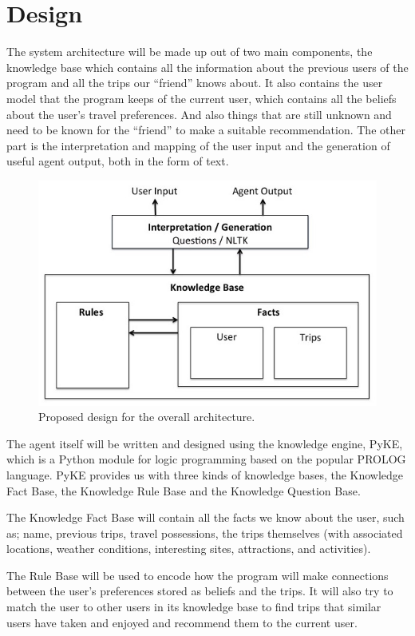 \documentclass[11pt]{article} %
\begin{document}
\section{Design}
The system architecture will be made up out of two main
components, the knowledge base which contains all the
information about the previous users of the program and
all the trips our ``friend'' knows about. It also contains
the user model that the program keeps of the current
user, which contains all the beliefs about the user’s
travel preferences. And also things that are still unknown
and need to be known for the ``friend'' to make a suitable
recommendation. The other part is the interpretation and
mapping of the user input and the generation of useful
agent output, both in the form of text.

\begin{figure}[H]
\centering
\includegraphics[width=12cm]{architecture.jpg}
\caption{Proposed design for the overall architecture.}
\end{figure}

The agent itself will be written and designed using the
knowledge engine, PyKE, which is a Python module for logic
programming based on the popular PROLOG language.
PyKE provides us with three kinds of knowledge bases,
the Knowledge Fact Base, the Knowledge Rule Base and
the Knowledge Question Base.

The Knowledge Fact Base will contain all the facts we
know about the user, such as; name, previous trips, travel
possessions, the trips themselves (with associated
locations, weather conditions, interesting sites,
attractions, and activities).

The Rule Base will be used to encode how the program
will make connections between the user’s preferences
stored as beliefs and the trips. It will also try to match
the user to other users in its knowledge base to find
trips that similar users have taken and enjoyed and
recommend them to the current user.
\end{document}
